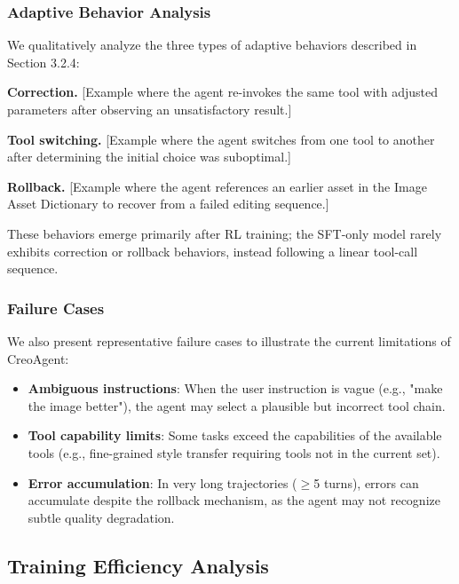 \documentclass{article}
\begin{document}
\subsubsection{Adaptive Behavior Analysis}

We qualitatively analyze the three types of adaptive behaviors described in Section 3.2.4:

\textbf{Correction.} [Example where the agent re-invokes the same tool with adjusted parameters after observing an unsatisfactory result.]

\textbf{Tool switching.} [Example where the agent switches from one tool to another after determining the initial choice was suboptimal.]

\textbf{Rollback.} [Example where the agent references an earlier asset in the Image Asset Dictionary to recover from a failed editing sequence.]

These behaviors emerge primarily after RL training; the SFT-only model rarely exhibits correction or rollback behaviors, instead following a linear tool-call sequence.

\subsubsection{Failure Cases}

We also present representative failure cases to illustrate the current limitations of CreoAgent:

\begin{itemize}
    \item \textbf{Ambiguous instructions}: When the user instruction is vague (e.g., "make the image better"), the agent may select a plausible but incorrect tool chain.
    \item \textbf{Tool capability limits}: Some tasks exceed the capabilities of the available tools (e.g., fine-grained style transfer requiring tools not in the current set).
    \item \textbf{Error accumulation}: In very long trajectories ($\geq$5 turns), errors can accumulate despite the rollback mechanism, as the agent may not recognize subtle quality degradation.
\end{itemize}

\subsection{Training Efficiency Analysis}
\end{document}
